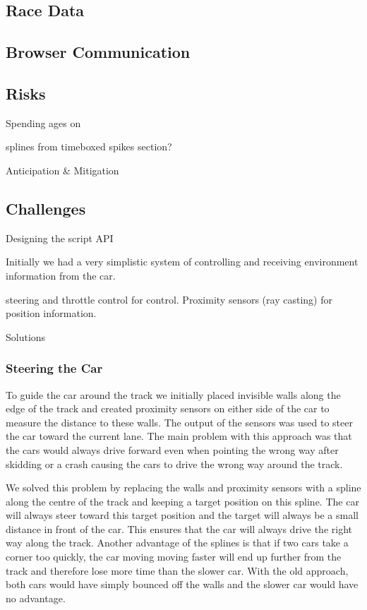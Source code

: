 \subsection{Race Data}

\subsection{Browser Communication}

\subsection{Risks}
Spending ages on

splines from timeboxed spikes section?

Anticipation \& Mitigation

\subsection{Challenges}
Designing the script API

Initially we had a very simplistic system of controlling and receiving environment information from the car.

steering and throttle control for control. Proximity sensors (ray casting) for position information.

Solutions

\subsubsection{Steering the Car}
To guide the car around the track we initially placed invisible walls along the edge of the track and created proximity sensors on either side of the car to measure the distance to these walls. The output of the sensors was used to steer the car toward the current lane. The main problem with this approach was that the cars would always drive forward even when pointing the wrong way after skidding or a crash causing the cars to drive the wrong way around the track.

We solved this problem by replacing the walls and proximity sensors with a spline along the centre of the track and keeping a target position on this spline. The car will always steer toward this target position and the target will always be a small distance in front of the car. This ensures that the car will always drive the right way along the track. Another advantage of the splines is that if two cars take a corner too quickly, the car moving moving faster will end up further from the track and therefore lose more time than the slower car. With the old approach, both cars would have simply bounced off the walls and the slower car would have no advantage.

